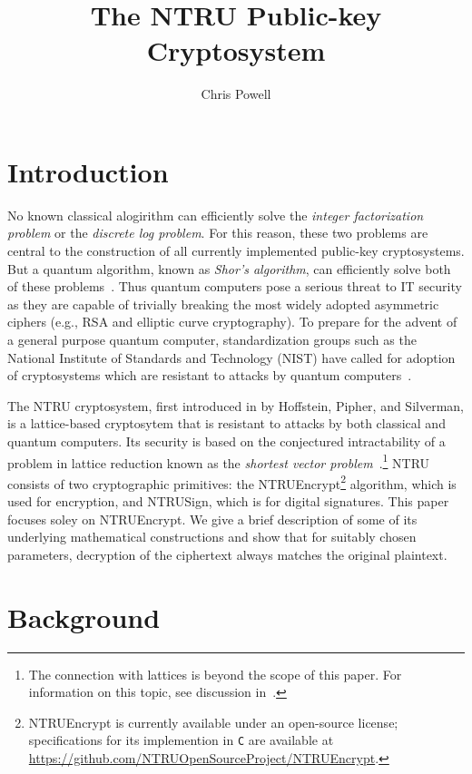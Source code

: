 \documentclass[10pt,reqno]{article}
\begin{document}
\title{\vspace{-1cm}\textbf{\LARGE{The NTRU Public-key Cryptosystem}}}
\author{Chris Powell}
\date{}
\maketitle
\thispagestyle{fancy}
\section{Introduction}
No known classical alogirithm can efficiently solve the \emph{integer factorization problem} or the \emph{discrete log problem}. For this reason, these two problems are central to the construction of all currently implemented public-key cryptosystems. But a quantum algorithm, known as \emph{Shor's algorithm}, can efficiently solve both of these problems~\cite{Shor:1997:PAP:264393.264406}. Thus quantum computers pose a serious threat to IT security as they are capable of trivially breaking the most widely adopted asymmetric ciphers (e.g., RSA and elliptic curve cryptography). To prepare for the advent of a general purpose quantum computer, standardization groups such as the National Institute of Standards and Technology (NIST) have called for adoption of cryptosystems which are resistant to attacks by quantum computers~\cite{unknown}.

The NTRU cryptosystem, first introduced in \cite{Hoffstein98ntru:a} by Hoffstein, Pipher, and Silverman, is a lattice-based cryptosytem that is resistant to attacks by both classical and quantum computers. Its security is based on the conjectured intractability of a problem in lattice reduction known as the \emph{shortest vector problem}~\cite{Pipher_josephh.}.\footnote{The connection with lattices is beyond the scope of this paper. For information on this topic, see discussion in~\cite[\S 6.11]{Pipher_josephh.}.} 
 NTRU consists of two cryptographic primitives: the \textsf{NTRUEncrypt}\footnote{\textsf{NTRUEncrypt} is currently available under an open-source license; specifications for its implemention in \texttt{C} are available at \url{https://github.com/NTRUOpenSourceProject/NTRUEncrypt}.} algorithm, which is used for encryption, and \textsf{NTRUSign}, which is for digital signatures. This paper focuses soley on \textsf{NTRUEncrypt}. We give a brief description of some of its underlying mathematical constructions and show that for suitably chosen parameters, decryption of the ciphertext always matches the original plaintext.

\section{Background}
\end{document}
